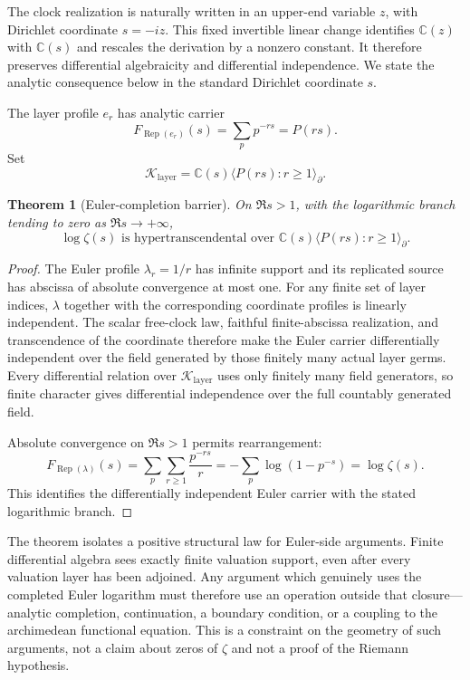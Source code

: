 \documentclass[11pt]{article}
\newtheorem{theorem}{Theorem}[section]
\theoremstyle{definition}
\theoremstyle{remark}
\newcommand{\C}{\mathbb C}
\newcommand{\cK}{\mathcal K}
\newcommand{\diff}{\partial}
\begin{document}
The clock realization is naturally written in an upper-end variable \(z\), with Dirichlet
coordinate \(s=-iz\).  This fixed invertible linear change identifies \(\C(z)\) with \(\C(s)\)
and rescales the derivation by a nonzero constant.  It therefore preserves differential
algebraicity and differential independence.  We state the analytic consequence below in the
standard Dirichlet coordinate \(s\).

The layer profile \(e_r\) has analytic carrier
\begin{equation}\label{eq:prime-zeta-layer}
  F_{\operatorname{Rep}(e_r)}(s)=\sum_p p^{-rs}=P(rs).
\end{equation}
Set
\begin{equation}\label{eq:analytic-layer-field}
  \cK_{\mathrm{layer}}=
  \C(s)\langle P(rs):r\geq1\rangle_{\diff}.
\end{equation}

\begin{theorem}[Euler-completion barrier]\label{thm:euler}
On \(\Re s>1\), with the logarithmic branch tending to zero as \(\Re s\to+\infty\),
\begin{equation}\label{eq:logzeta-ht}
  \log\zeta(s)\text{ is hypertranscendental over }
  \C(s)\langle P(rs):r\geq1\rangle_{\diff}.
\end{equation}
\end{theorem}

\begin{proof}
The Euler profile \(\lambda_r=1/r\) has infinite support and its replicated source has abscissa
of absolute convergence at most one.  For any finite set of layer indices, \(\lambda\) together
with the corresponding coordinate profiles is linearly independent.  The scalar free-clock law,
faithful finite-abscissa realization, and transcendence of the coordinate therefore make the
Euler carrier differentially independent over the field generated by those finitely many actual
layer germs.  Every differential relation over \(\cK_{\mathrm{layer}}\) uses only finitely many
field generators, so finite character gives differential independence over the full countably
generated field.

Absolute convergence on \(\Re s>1\) permits rearrangement:
\[
  F_{\operatorname{Rep}(\lambda)}(s)
  =\sum_p\sum_{r\geq1}\frac{p^{-rs}}r
  =-\sum_p\log(1-p^{-s})
  =\log\zeta(s).
\]
This identifies the differentially independent Euler carrier with the stated logarithmic branch.
\end{proof}

\medskip
\noindent
The theorem isolates a positive structural law for Euler-side arguments.  Finite differential
algebra sees exactly finite valuation support, even after every valuation layer has been
adjoined.  Any argument which genuinely uses the completed Euler logarithm must therefore use an
operation outside that closure---analytic completion, continuation, a boundary condition, or a
coupling to the archimedean functional equation.  This is a constraint on the geometry of such
arguments, not a claim about zeros of \(\zeta\) and not a proof of the Riemann hypothesis.
\end{document}
